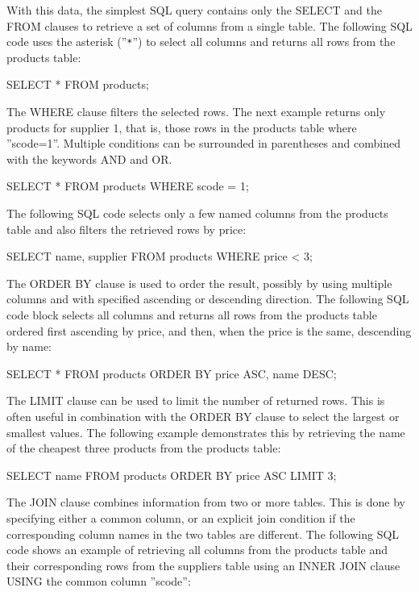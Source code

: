 With this data, the simplest SQL query contains only the SELECT and the FROM clauses to retrieve a set of columns from a single table. The following SQL code uses the asterisk (''\texttt{*}'') to select all columns and returns all rows from the products table:

\begin{sqlcode}
SELECT * FROM products;
\end{sqlcode}

The WHERE clause filters the selected rows. The next example returns only products for supplier 1, that is, those rows in the products table where ''scode=1''. Multiple conditions can be surrounded in parentheses and combined with the keywords AND and OR.

\begin{sqlcode}
SELECT * FROM products WHERE scode = 1;
\end{sqlcode}

The following SQL code selects only a few named columns from the products table and also filters the retrieved rows by price:

\begin{sqlcode}
SELECT name, supplier FROM products WHERE price < 3;
\end{sqlcode}

The ORDER BY clause is used to order the result, possibly by using multiple columns and with specified ascending or descending direction. The following SQL code block selects all columns and returns all rows from the products table ordered first ascending by price, and then, when the price is the same, descending by name:

\begin{sqlcode}
SELECT * FROM products ORDER BY price ASC, name DESC;
\end{sqlcode}

The LIMIT clause can be used to limit the number of returned rows. This is often useful in combination with the ORDER BY clause to select the largest or smallest values. The following example demonstrates this by retrieving the name of the cheapest three products from the products table:

\begin{sqlcode}
SELECT name FROM products ORDER BY price ASC LIMIT 3;
\end{sqlcode}

The JOIN clause combines information from two or more tables. This is done by specifying either a common column, or an explicit join condition if the corresponding column names in the two tables are different. The following SQL code shows an example of retrieving all columns from the products table and their corresponding rows from the suppliers table using an INNER JOIN clause USING the common column ''scode'':

